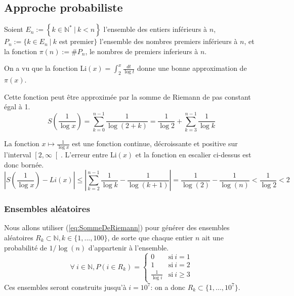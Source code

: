 \documentclass[../main.tex]{report}
\begin{document}
    \label{sec:test1}
    
\subsection{Approche probabiliste}
Soient $E_n := \left\{ k \in \mathbb{N}^* ~|~k < n \right\}$ l'ensemble des entiers inférieurs à $n$, $ P_n := \{k \in E_n~|~ k$ est premier$ \}$ l'ensemble des nombres premiers inférieurs à $n$, et la fonction $\pi (n) := \#P_n$, le nombres de premiers inferieurs à $n$.

On a vu que la fonction Li$(x) = \int_2^x \frac{dt}{\log t}$ 
donne une bonne approximation de $\pi(x)$.

Cette fonction peut être approximée par la somme de Riemann de pas constant égal à 1.
\begin{equation}
\label{eq:SommeDeRiemann}
S \left({\frac{1}{\log x}} \right)
= \sum_{k=0}^{n-1} \frac{1}{\log(2 + k)}
= \frac{1}{\log 2} + \sum_{k=3}^{n-1} \frac{1}{\log k}
\end{equation}


La fonction $x \mapsto \frac{1}{\log x}$ est une fonction continue, décroissante et positive sur l'interval $\left[2, \infty \right[$. 
L'erreur entre Li$(x)$ et la fonction en escalier ci-dessus est donc bornée. 
 \[ 
\left| S(\frac{1}{\log x}) - Li(x) \right|
\leq \left| \sum_{k=2}^{n-1} \frac{1}{\log k} - \frac{1}{\log (k+1)} \right| 
 = \frac{1}{\log (2)} - \frac{1}{\log (n)}
 < \frac{1}{\log 2}
 < 2
 \]


\subsubsection{Ensembles aléatoires} 

Nous allons utiliser (\ref{eq:SommeDeRiemann}) pour générer des ensembles aléatoires $R_{k} \subset \mathbb{N}, k \in \{1,...,100\}$, de sorte que chaque entier $n$ ait une probabilité de $1/\log(n)$ d'appartenir à l'ensemble. 
\[
\forall~i \in \mathbb{N}, P(i \in R_{k}) = 
\left\{ 
    \begin{array}{cl}
         0 & \mbox{si}~i = 1 \\
         1 & \mbox{si}~i = 2 \\
         \frac{1}{\log i} & \mbox{si}~i \geq 3
    \end{array}
\right.
\]
Ces ensembles seront construits jusqu'à $i = 10^7$: on a donc $R_k \subset \{1,...,10^7\}$. 
\end{document}
